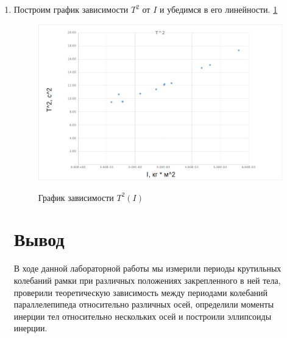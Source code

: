\documentclass[a4paper,12pt]{article} %
\begin{document}
\begin{enumerate}
\item Построим график зависимости $T^2$ от $I$ и убедимся в его линейности. \ref{pic:6}

\newpage

\begin{figure} [h] \center
	\includegraphics[scale=0.5]{124/graph.png}
	\label{pic:6} \caption[Рис. 6]{График зависимости $T^2(I)$}
\end{figure}

\section{Вывод}
В ходе данной лабораторной работы мы измерили периоды крутильных колебаний рамки при различных положениях закрепленного в ней тела, проверили теоретическую зависимость между периодами колебаний параллелепипеда относительно различных осей, определили моменты инерции тел относительно нескольких осей и построили эллипсоиды инерции.

\end{enumerate}
\end{document}

